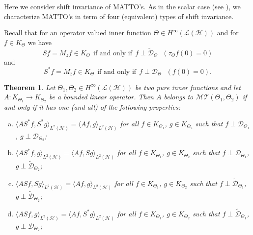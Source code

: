 \documentclass[11pt]{amsart}
\numberwithin{equation}{section}
\newcommand{\hsp}{\mathcal{H}}
\newcommand{\oL }{\mathcal{L}(\hsp) }
\newtheorem{theorem}{Theorem}[section]
\theoremstyle{definition}
\numberwithin{equation}{section}
\begin{document}
 Here we consider shift invariance of MATTO's. As in the scalar case (see \cite{BM}), we characterize MATTO's in term of four (equivalent) types of shift invariance.

Recall that for an operator valued inner function $\Theta\in H^\infty(\oL)$ and for $f\in K_{\Theta}$ we have
$$Sf=M_zf\in K_{\Theta}~~\text{if and only if} ~~ f\perp \widetilde{\mathcal{D}}_{\Theta}~~~ (\tau_\Theta f(0)=0)$$
and
$$S^*f=M_{\overline{z}}f\in K_{\Theta} ~~ \text{if and only if} ~~ f\perp\mathcal{D}_{\Theta}~~ ~(f(0)=0).$$
\begin{theorem}
Let $\Theta_1, \Theta_2\in H^\infty(\oL)$ be two pure inner functions and let $A:K_{\Theta_1}\to K_{\Theta_2}$ be a bounded linear operator. Then $A$ belongs to $\mathcal{MT}(\Theta_1, \Theta_2)$ if and only if it has one (and all) of the following properties:
\begin{enumerate}[(a)]
\item $\langle AS^*f, S^*g\rangle_{L^2(\hsp)}=\langle A f,g\rangle_{L^2(\hsp)}$ for all $f\in K_{\Theta_1}$, $g\in K_{\Theta_2}$ such that $f\perp\mathcal{D}_{\Theta_1}$, $g\perp\mathcal{D}_{\Theta_2}$;\label{T1}
    \item $\langle AS^*f, g\rangle_{L^2(\hsp)}=\langle Af,Sg\rangle_{L^2(\hsp)}$ for all $f\in K_{\Theta_1}$, $g\in K_{\Theta_2}$ such that $f\perp\mathcal{D}_{\Theta_1}$, $g\perp\widetilde{\mathcal{D}}_{\Theta_2}$;\label{T2}
    \item $\langle ASf, Sg\rangle_{L^2(\hsp)}=\langle Af,g\rangle_{L^2(\hsp)}$ for all $f\in K_{\Theta_1}$, $g\in K_{\Theta_2}$ such that $f\perp\widetilde{\mathcal{D}}_{\Theta_1}$, $g\perp\widetilde{\mathcal{D}}_{\Theta_2}$;\label{T3}
    \item $\langle ASf, g\rangle_{L^2(\hsp)}=\langle Af,S^*g\rangle_{L^2(\hsp)}$ for all $f\in K_{\Theta_1}$, $g\in K_{\Theta_2}$ such that $f\perp\widetilde{\mathcal{D}}_{\Theta_1}$, $g\perp\mathcal{D}_{\Theta_2}$;\label{T4}
\end{enumerate}
\end{theorem}
\end{document}
